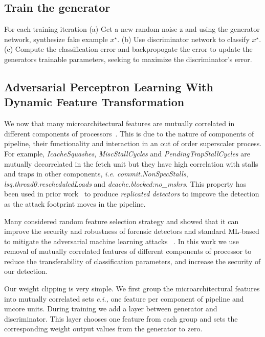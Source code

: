 \subsection{Train the generator}
For each training iteration
(a) Get a new random noise z and using the generator network, synthesize fake example $x^{\star}$. (b) Use discriminator network to classify $x^{\star}$. (c) Compute the classification error and backpropogate the error to update the generators trainable parameters, seeking to maximize the discriminator's error. 


 
\subsection{Adversarial Perceptron Learning With Dynamic Feature Transformation}
We now that many microarchitectural features are mutually correlated in different components of processors~\cite{PerSpectron}. This is due to the nature of components of pipeline, their functionality and interaction in an out of order superscaler process. For example, \textit{IcacheSquashes}, \textit{MiscStallCycles} and \textit{PendingTrapStallCycles} 
are mutually decorrelated in the fetch unit but they have high correlation with stalls 
and traps in other components, {\em i.e.} \textit{commit.NonSpecStalls}, 
\textit{lsq.thread0.rescheduledLoads} and \textit{dcache.blocked:no\_mshrs}. This property has been used in prior work~\cite{PerSpectron} to produce {\em replicated detectors} to improve the detection as the attack footprint moves in the pipeline.


Many considered random feature selection
strategy and showed that it can improve the security and robustness of forensic detectors and
standard ML-based to mitigate the adversarial machine learning attacks ~\cite{nowroozi2020survey, secureDetection2019}.
 In this work we use removal of mutually correlated features of different components of processor to reduce the transferability of classification parameters, and increase the security of our 
detection. 

Our weight clipping is very simple. We first group the microarchitectural features into mutually correlated sets {\em e.i.,} one feature per component of pipeline and uncore units. During training we add a layer between generator and discriminator. This layer chooses one feature from each group and sets the corresponding weight output values from the generator to zero.


